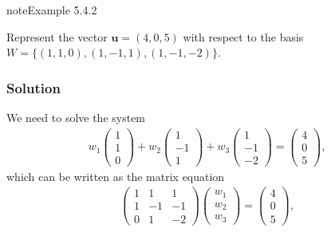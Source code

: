 \documentclass[letterpaper,10pt,english]{jupyterBook}
\begin{document}
\label{_pages/5.4_Basis:change-of-basis-example}
\begin{sphinxadmonition}{note}{Example 5.4.2}



\sphinxAtStartPar
Represent the vector \(\mathbf{u} = (4, 0, 5)\) with respect to the basis \(W = \{ (1, 1, 0), (1, -1, 1), (1, -1, -2)\}\).
\subsubsection*{Solution}

\sphinxAtStartPar
We need to solve the system
\begin{equation*}
\begin{split} w_1 \begin{pmatrix} 1 \\ 1 \\ 0 \end{pmatrix} +
    w_2 \begin{pmatrix} 1 \\ -1 \\ 1 \end{pmatrix} +
    w_3 \begin{pmatrix} 1 \\ -1 \\ -2 \end{pmatrix} =
    \begin{pmatrix} 4 \\ 0 \\ 5 \end{pmatrix}, \end{split}
\end{equation*}
\sphinxAtStartPar
which can be written as the matrix equation
\begin{equation*}
\begin{split} \begin{pmatrix}
        1 & 1 & 1 \\
        1 & -1 & -1 \\
        0 & 1 & -2
    \end{pmatrix}
    \begin{pmatrix} w_1 \\ w_2 \\ w_3 \end{pmatrix} =
    \begin{pmatrix} 4 \\ 0 \\ 5 \end{pmatrix}, \end{split}
\end{equation*}

\end{sphinxadmonition}
\end{document}
